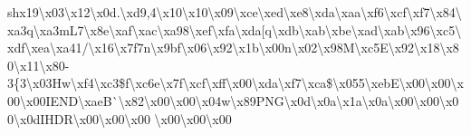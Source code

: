 \begin{DoxyCompactItemize}
sh{}x19\textbackslash{}x03\textbackslash{}x12\textbackslash{}x0d.\textbackslash{}xd9,4\textbackslash{}x10\textbackslash{}x10\textbackslash{}x09\textbackslash{}xce\textbackslash{}xed\textbackslash{}xe8\textbackslash{}xda\textbackslash{}xaa\textbackslash{}xf6\textbackslash{}xcf\textbackslash{}xf7\textbackslash{}x84\textbackslash{}xa3q\textbackslash{}xa3m\+L7\textbackslash{}x8e\textbackslash{}xaf\textbackslash{}xac\textbackslash{}xa98\textbackslash{}xef\textbackslash{}xfa\textbackslash{}xda\mbox{[}q\textbackslash{}xdb\textbackslash{}xab\textbackslash{}xbe\textbackslash{}xad\textbackslash{}xab\textbackslash{}x96\textbackslash{}xc5\textbackslash{}xdf\textbackslash{}xea\textbackslash{}xa41/\textbackslash{}x16\textbackslash{}x7f7n\textbackslash{}x9bf\textbackslash{}x06\textbackslash{}x92\textbackslash{}x1b\textbackslash{}x00n\textbackslash{}x02\textbackslash{}x98\+M\textbackslash{}xc5\+E\textbackslash{}x92\textbackslash{}x18\textbackslash{}x80\textbackslash{}x11\textbackslash{}x80-\/3\{3\textbackslash{}x03\+Hw\textbackslash{}xf4\textbackslash{}xc3\$f\textbackslash{}xc6e\textbackslash{}x7f\textbackslash{}xcf\textbackslash{}xff\textbackslash{}x00\textbackslash{}xda\textbackslash{}xf7\textbackslash{}xca\$\textbackslash{}x055\textbackslash{}xeb\+E\textbackslash{}x00\textbackslash{}x00\textbackslash{}x00\textbackslash{}x00\+I\+E\+N\+D\textbackslash{}xae\+B\`{}\textbackslash{}x82\textbackslash{}x00\textbackslash{}x00\textbackslash{}x04w\textbackslash{}x89\+P\+N\+G\textbackslash{}x0d\textbackslash{}x0a\textbackslash{}x1a\textbackslash{}x0a\textbackslash{}x00\textbackslash{}x00\textbackslash{}x00\textbackslash{}x0d\+I\+H\+D\+R\textbackslash{}x00\textbackslash{}x00\textbackslash{}x00 \textbackslash{}x00\textbackslash{}x00\textbackslash{}x00 
\end{DoxyCompactItemize}
